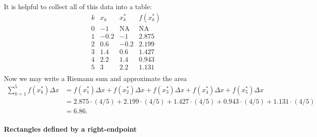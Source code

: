 \documentclass{ximera}
\begin{document}
\begin{example}
\begin{explanation}
\begin{image}
\end{image}
It is helpful to collect all of this data into a table:
\[
\begin{array}{c|c|c|c}
  k &  x_k & x^*_k & f(x^*_k) \\ \hline
  0 & -1   & \text{NA} & \text{NA}  \\
  1 & -0.2 & -1        &   2.875     \\
  2 & 0.6  & -0.2      & 2.199   \\
  3 & 1.4  & 0.6       & 1.427    \\
  4 & 2.2  & 1.4       & 0.943   \\
  5 & 3    &  2.2      & 1.131        \\
\end{array}
\]
Now we may write a Riemann sum and approximate the area
\begin{align*}
  \sum_{k=1}^5  f(x_k^*)\Delta x  &= f(x_1^*)\Delta x +  f(x_2^*)\Delta x +   f(x_3^*)\Delta x +f(x_4^*)\Delta x+   f(x_5^*)\Delta x\\
  &= 2.875 \cdot (4/5) + 2.199  \cdot(4/5) + 1.427  \cdot(4/5) + 0.943  \cdot(4/5) + 1.131  \cdot(4/5)\\
  &= 6.86.
\end{align*}
  \end{explanation}
\end{example}


\paragraph{Rectangles defined by a right-endpoint}
\end{document}
